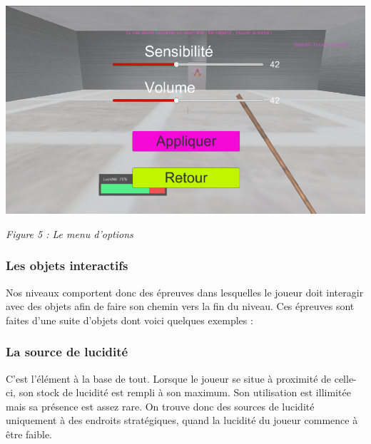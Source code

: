 \documentclass[a4paper , 12pt]{article}
\begin{document}
\begin{centering}

\quad

\quad

\includegraphics[scale = 0.65]{Menu_options.png}

\quad

\textit{Figure 5 : Le menu d'options}

\end{centering}

\newpage

		\subsubsection{Les objets interactifs}

	\quad

Nos niveaux comportent donc des épreuves dans lesquelles le joueur doit interagir avec des objets afin de faire son chemin vers la fin du niveau. Ces épreuves sont faites d’une suite d’objets dont voici quelques exemples :

\quad

		\subsubsection{La source de lucidité}

\quad

 C’est l’élément à la base de tout. Lorsque le joueur se situe à proximité de celle-ci, son stock de lucidité est rempli à son maximum. Son utilisation est illimitée mais sa présence est assez rare. On trouve donc des sources de lucidité uniquement à des endroits stratégiques, quand la lucidité du joueur commence à être faible.

	\quad
\end{document}
